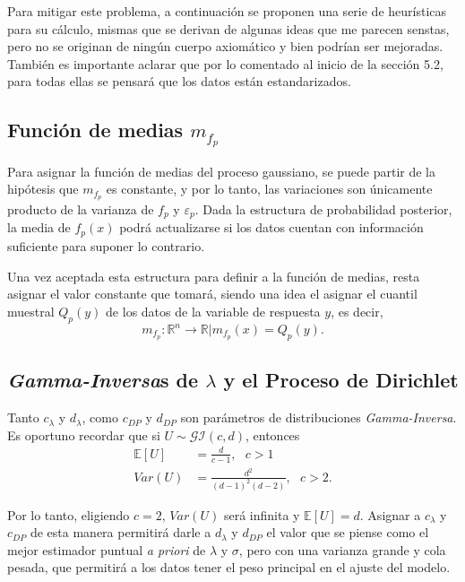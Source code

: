 Para mitigar este problema, a continuaci\'on se proponen una serie de heur\'isticas para su c\'alculo, mismas que se derivan de algunas ideas que me parecen senstas, pero no se originan de ning\'un cuerpo axiom\'atico y bien podr\'ian ser mejoradas. Tambi\'en es importante aclarar que por lo comentado al inicio de la secci\'on 5.2, para todas ellas se pensar\'a que los datos est\'an estandarizados.

\subsection{Funci\'on de medias $m_{f_p}$}

Para asignar la funci\'on de medias del proceso gaussiano, se puede partir de la hip\'otesis que $m_{f_p}$ es constante, y por lo tanto, las variaciones son \'unicamente producto de la varianza de $f_p$ y $\varepsilon_p$. Dada la estructura de probabilidad posterior, la media de $f_p(x)$ podr\'a actualizarse si los datos cuentan con informaci\'on suficiente para suponer lo contrario. 

Una vez aceptada esta estructura para definir a la funci\'on de medias, resta asignar el valor constante que tomar\'a, siendo una idea el asignar el cuantil muestral $Q_p(y)$ de los datos de la variable de respuesta $y$, es decir,
\begin{equation*}
    m_{f_p}:\mathbb{R}^n \rightarrow \mathbb{R} | m_{f_p}(x) = Q_p(y).
\end{equation*}

\subsection{\textit{Gamma-Inversa}s de $\lambda$ y el Proceso de Dirichlet}

Tanto $c_\lambda$ y $d_\lambda$, como $c_{DP}$ y $d_{DP}$ son par\'ametros de distribuciones \textit{Gamma-Inversa}. Es oportuno recordar que si $U \sim \mathcal{GI}(c,d)$, entonces
\begin{equation*}
\begin{aligned}
    \mathbb{E}[U] &= \frac{d}{c-1}, \text{ } c>1\\
    Var(U) &= \frac{d^2}{(d-1)^2(d-2)}, \text{ } c>2.
\end{aligned}
\end{equation*}

Por lo tanto, eligiendo $c = 2$, $Var(U)$ ser\'a infinita y $\mathbb{E}[U] = d$. Asignar a $c_\lambda$ y $c_{DP}$ de esta manera permitir\'a darle a $d_\lambda$ y $d_{DP}$ el valor que se piense como el mejor estimador puntual \textit{a priori} de $\lambda$ y $\sigma$, pero con una varianza grande y cola pesada, que permitir\'a a los datos tener el peso principal en el ajuste del modelo. 

